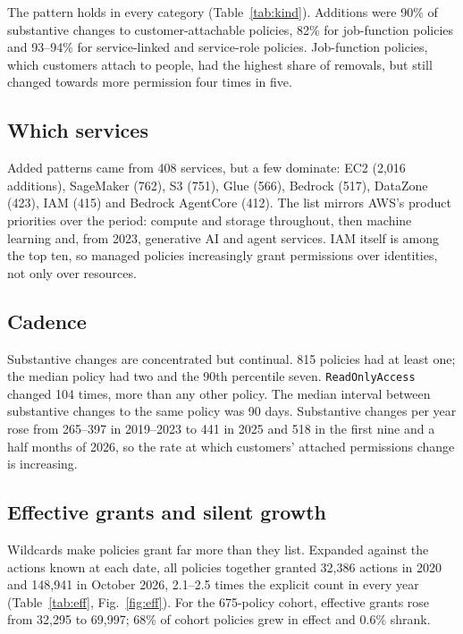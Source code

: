 \documentclass[journal]{IEEEtran}
\begin{document}
The pattern holds in every category (Table~\ref{tab:kind}). Additions were 90\% of substantive changes to customer-attachable policies,
82\% for job-function policies and 93--94\% for service-linked and service-role policies. Job-function policies, which customers attach
to people, had the highest share of removals, but still changed towards more permission four times in five.



\subsection{Which services}
\label{sec:services}
Added patterns came from 408 services, but a few dominate: EC2 (2{,}016 additions), SageMaker (762), S3 (751), Glue (566), Bedrock (517),
DataZone (423), IAM (415) and Bedrock AgentCore (412). The list mirrors AWS's product priorities over the period: compute and storage
throughout, then machine learning and, from 2023, generative AI and agent services. IAM itself is among the top ten, so managed policies
increasingly grant permissions over identities, not only over resources.

\subsection{Cadence}
\label{sec:cadence}
Substantive changes are concentrated but continual. 815 policies had at least one; the median policy had two and the 90th percentile
seven. \texttt{ReadOnlyAccess} changed 104 times, more than any other policy. The median interval between substantive changes to the same
policy was 90 days. Substantive changes per year rose from 265--397 in 2019--2023 to 441 in 2025 and 518 in the first nine and a half months
of 2026, so the rate at which customers' attached permissions change is increasing.

\subsection{Effective grants and silent growth}
\label{sec:silent}


Wildcards make policies grant far more than they list. Expanded against the actions known at each date, all policies together granted
32{,}386 actions in 2020 and 148{,}941 in October 2026, 2.1--2.5 times the explicit count in every year (Table~\ref{tab:eff},
Fig.~\ref{fig:eff}). For the 675-policy cohort, effective grants rose from 32{,}295 to 69{,}997; 68\% of cohort policies grew in effect and
0.6\% shrank.
\end{document}
